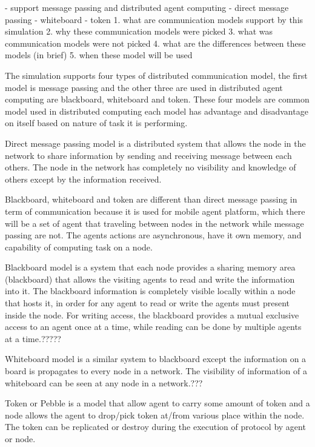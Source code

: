 - support message passing and distributed agent computing
	- direct message passing
	- whiteboard
	- token
1. what are communication models support by this simulation
2. why these communication models were picked
3. what was communication models were not picked
4. what are the differences between these models (in brief)
5. when these model will be used

The simulation supports four types of distributed communication model, the first model is message passing and the other three are used in distributed agent computing are blackboard, whiteboard and token. These four models are common model used in distributed computing each model has advantage and disadvantage on itself based on nature of task it is performing.

Direct message passing model is a distributed system that allows the node in the network to share information by sending and receiving message between each others. The node in the network has completely no visibility and knowledge of others except by the information received.

Blackboard, whiteboard and token are different than direct message passing in term of communication because it is used for mobile agent platform, which there will be a set of agent that traveling between nodes in the network while message passing are not. The agents actions are asynchronous, have it own memory, and capability of computing task on a node.

Blackboard model is a system that each node provides a sharing memory area (blackboard) that allows the visiting agents to read and write the information into it. The blackboard information is completely visible locally within a node that hosts it, in order for any agent to read or write the agents must present inside the node. For writing access, the blackboard provides a mutual exclusive access to an agent once at a time, while reading can be done by multiple agents at a time.?????

Whiteboard model is a similar system to blackboard except the information on a board is propagates to every node in a network. The visibility of information of a whiteboard can be seen at any node in a network.???

Token or Pebble is a model that allow agent to carry some amount of token and a node allows the agent to drop/pick  token at/from various place within the node. The token can be replicated or destroy during the execution of protocol by agent or node.



